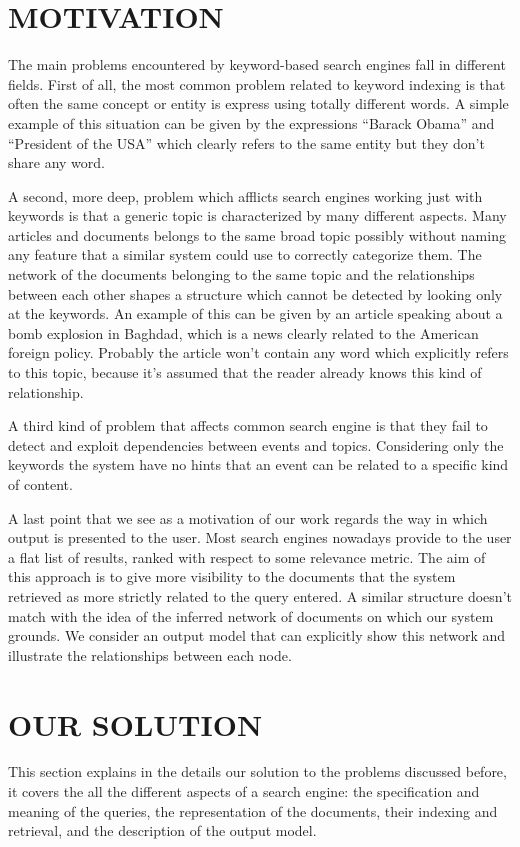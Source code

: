 \documentclass{acm_proc_article-sp-sigmod07}
\begin{document}
\section{MOTIVATION}
The main problems encountered by keyword-based search engines fall in
different fields. First of all, the most common problem related to keyword
indexing is that often the same concept or entity is express using totally
different words.
A simple example of this situation can be given by the expressions ``Barack
Obama'' and ``President of the USA'' which clearly refers to the same
entity but they don't share any word.

A second, more deep, problem which afflicts search engines working just
with keywords is that a generic topic is characterized by many
different aspects. Many articles and documents belongs to the same broad
topic possibly without naming any feature that a similar system could use
to correctly categorize them.
The network of the documents belonging to the same topic and the
relationships between each other shapes a structure which cannot be
detected by looking only at the keywords.
An example of this can be given by an article speaking about a bomb
explosion in Baghdad, which is a news clearly related to the American
foreign policy. Probably the article won't contain any word which
explicitly refers to this topic, because it's assumed that the reader
already knows this kind of relationship.

A third kind of problem that affects common search engine is that they
fail to detect and exploit dependencies between events and topics.
Considering only the keywords the system have no hints that an event can
be related to a specific kind of content.

A last point that we see as a motivation of our work regards the way in
which output is presented to the user. Most search engines nowadays
provide to the user a flat list of results, ranked with respect to some
relevance metric. The aim of this approach is to give more visibility to
the documents that the system retrieved as more strictly related to the
query entered. 
A similar structure doesn't match with the idea of the inferred network of
documents on which our system grounds. We consider an output model that
can explicitly show this network and illustrate the relationships between
each node.

\section{OUR SOLUTION}
This section explains in the details our solution to the problems
discussed before, it covers the all the different aspects of a search
engine: the specification and meaning of the queries, the representation
of the documents, their indexing and retrieval, and the description of the
output model.
\end{document}
